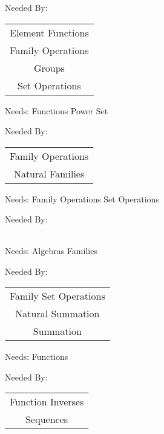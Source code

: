 Needed By: \begin{tabular}{c} Element Functions \\  Family Operations \\  Groups \\  Set Operations \\ 
\end{tabular}
\clearpage{}

\newpage
\label{families}


\clearpage
Needs:  Functions  Power Set 

Needed By: \begin{tabular}{c} Family Operations \\  Natural Families \\ 
\end{tabular}
\clearpage{}

\newpage
\label{family_set_operations}


\clearpage
Needs:  Family Operations  Set Operations 

Needed By: \begin{tabular}{c}
\end{tabular}
\clearpage{}

\newpage
\label{family_operations}


\clearpage
Needs:  Algebras  Families 

Needed By: \begin{tabular}{c} Family Set Operations \\  Natural Summation \\  Summation \\ 
\end{tabular}
\clearpage{}

\newpage
\label{function_composites}


\clearpage
Needs:  Functions 

Needed By: \begin{tabular}{c} Function Inverses \\  Sequences \\ 
\end{tabular}
\clearpage{}

